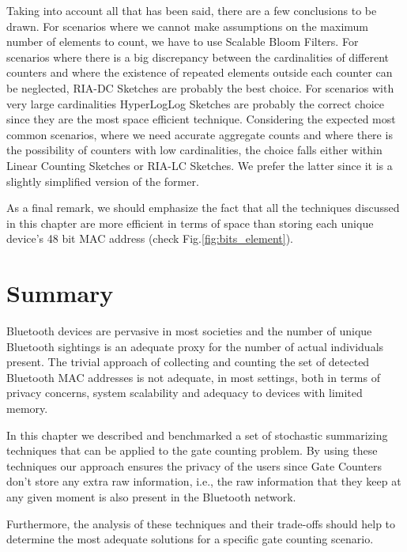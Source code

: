 Taking into account all that has been said, there are a few
conclusions to be drawn. For scenarios where we cannot make
assumptions on the maximum number of elements to count, we have to use
Scalable Bloom Filters. For scenarios where there is a big discrepancy
between the cardinalities of different counters and where the
existence of repeated elements outside each counter can be neglected,
RIA-DC Sketches are probably the best choice. For scenarios with very
large cardinalities HyperLogLog Sketches are probably the correct
choice since they are the most space efficient technique.  Considering
the expected most common scenarios, where we need accurate aggregate
counts and where there is the possibility of counters with low
cardinalities, the choice falls either within Linear Counting Sketches
or RIA-LC Sketches. We prefer the latter since it is a slightly
simplified version of the former.

As a final remark, we should emphasize the fact that all the
techniques discussed in this chapter are more efficient in terms of
space than storing each unique device's 48 bit MAC address (check
Fig.\ref{fig:bits_element}).

\section{Summary}
\label{sec:gc_summary}
Bluetooth devices are pervasive in most societies and the number of unique
Bluetooth sightings is an adequate proxy for the number of actual individuals
present. The trivial approach of collecting and counting the set of detected
Bluetooth MAC addresses is not adequate, in most settings, both in terms of
privacy concerns, system scalability and adequacy to devices with limited
memory.

In this chapter we described and benchmarked a set of stochastic summarizing
techniques that can be applied to the gate counting problem. By using these
techniques our approach ensures the privacy of the users since Gate Counters
don't store any extra raw information, i.e., the raw information that
they keep at any given moment is also present in the Bluetooth network.

Furthermore, the analysis of these techniques and their trade-offs
should help to determine the most adequate solutions for a specific
gate counting scenario. %

